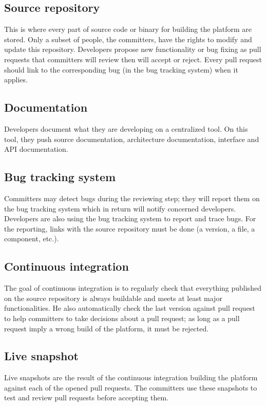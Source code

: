 \subsection{Source repository}
\label{sec:source-repository}

This is where every part of source code or binary for building the \learnpad platform are stored.
Only a subset of people, the committers, have the rights to modify and update this repository.
Developers propose new functionality or bug fixing as pull requests that committers will review then will accept or reject.
Every pull request should link to the corresponding bug (in the bug tracking system) when it applies.

\subsection{Documentation}
\label{sec:documentation}

Developers document what they are developing on a centralized tool.
On this tool, they push source documentation, architecture documentation, interface and API documentation.

\subsection{Bug tracking system}
\label{sec:bug tracking-system}

Committers may detect bugs during the reviewing step; they will report them on the bug tracking system which in return will notify concerned developers.
Developers are also using the bug tracking system to report and trace bugs.
For the reporting, links with the source repository must be done (a version, a file, a component, etc.).

\subsection{Continuous integration}
\label{sec:continuous-integration}

The goal of continuous integration is to regularly check that everything published on the source repository is always buildable and meets at least major functionalities.
He also automatically check the last version against pull request to help committers to take decisions about a pull request; as long as a pull request imply a wrong build of the platform, it must be rejected.

\subsection{Live snapshot}
\label{sec:live-snapshot}

Live snapshots are the result of the continuous integration building the \learnpad platform against each of the opened pull requests.
The committers use these snapshots to test and review pull requests before accepting them.
